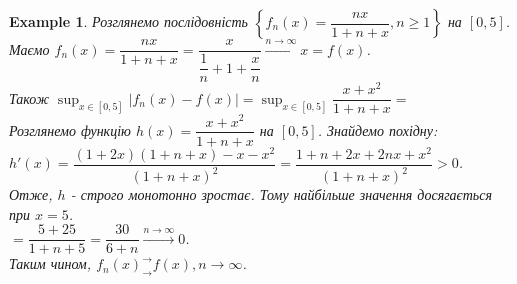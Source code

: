 \documentclass[a4paper, 10pt]{article}
\def\huge{\displaystyle}
\theoremstyle{theoremdd}
\theoremstyle{theoremdd}
\theoremstyle{theoremdd}
\theoremstyle{theoremdd}
\newtheorem{example}[theorem]{Example}
\theoremstyle{theoremdd}
\theoremstyle{theoremdd}
\theoremstyle{theoremdd}
\theoremstyle{theoremdd}
\begin{document}
\begin{example}
Розглянемо послідовність $\left\{ f_n(x) = \dfrac{nx}{1+n+x}, n \geq 1 \right\}$ на $[0,5]$.\\
Маємо $f_n(x) = \dfrac{nx}{1+n+x} = \dfrac{x}{\dfrac{1}{n}+ 1 + \dfrac{x}{n}} \overset{n \to \infty}{\longrightarrow} x = f(x)$.\\
Також $\huge\sup_{x \in [0,5]} |f_n(x) - f(x)| = \sup_{x \in [0,5]} \dfrac{x+x^2}{1+n+x} \boxed{=}$\\
Розглянемо функцію $h(x) = \dfrac{x+x^2}{1+n+x}$ на $[0,5]$. Знайдемо похідну:\\
$h'(x) = \dfrac{(1+2x)(1+n+x) - x-x^2}{(1+n+x)^2} = \dfrac{1+n+2x+2nx+x^2}{(1+n+x)^2} > 0$.\\
Отже, $h$ - строго монотонно зростає. Тому найбільше значення досягається при $x = 5$.\\
$\boxed{=} \dfrac{5+25}{1+n+5} = \dfrac{30}{6+n} \overset{n \to \infty}{\longrightarrow} 0$.\\
Таким чином, $f_n(x)^\rightarrow_\rightarrow f(x), n \to \infty$.
\end{example}

\end{document}
